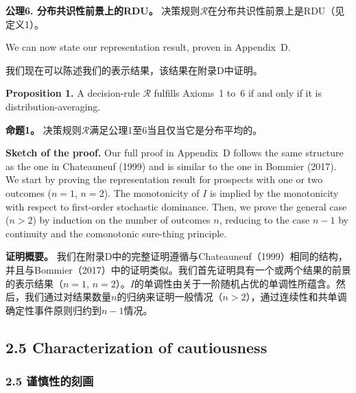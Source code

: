 \documentclass[12pt,a4paper]{article}
\newenvironment{original}
  {\par\noindent\ignorespaces}
  {\par}
\newenvironment{translation}
  {\par\noindent{\color{transblue}\ignorespaces}}
  {\par\medskip}
\begin{document}
\begin{translation}
\textbf{公理6. 分布共识性前景上的RDU。} 决策规则$\mathcal{R}$在分布共识性前景上是RDU（见定义1）。
\end{translation}

\begin{original}
We can now state our representation result, proven in Appendix~D.
\end{original}

\begin{translation}
我们现在可以陈述我们的表示结果，该结果在附录D中证明。
\end{translation}

\begin{original}
\textbf{Proposition 1.} A decision-rule $\mathcal{R}$ fulfills Axioms~1 to~6 if and only if it is distribution-averaging.
\end{original}

\begin{translation}
\textbf{命题1。} 决策规则$\mathcal{R}$满足公理1至6当且仅当它是分布平均的。
\end{translation}

\begin{original}
\textbf{Sketch of the proof.} Our full proof in Appendix~D follows the same structure as the one in Chateauneuf (1999) and is similar to the one in Bommier (2017). We start by proving the representation result for prospects with one or two outcomes ($n = 1$, $n = 2$). The monotonicity of $I$ is implied by the monotonicity with respect to first-order stochastic dominance. Then, we prove the general case ($n > 2$) by induction on the number of outcomes $n$, reducing to the case $n-1$ by continuity and the comonotonic sure-thing principle.
\end{original}

\begin{translation}
\textbf{证明概要。} 我们在附录D中的完整证明遵循与Chateauneuf（1999）相同的结构，并且与Bommier（2017）中的证明类似。我们首先证明具有一个或两个结果的前景的表示结果（$n = 1$, $n = 2$）。$I$的单调性由关于一阶随机占优的单调性所蕴含。然后，我们通过对结果数量$n$的归纳来证明一般情况（$n > 2$），通过连续性和共单调确定性事件原则归约到$n-1$情况。
\end{translation}

\subsection{2.5 Characterization of cautiousness}
{\color{transblue}\subsubsection*{2.5 谨慎性的刻画}}
\end{document}
